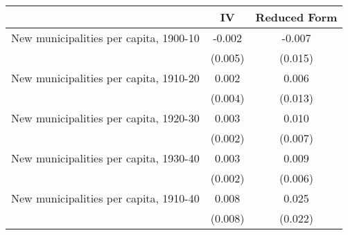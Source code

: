  \begin{tabular}{l*{2}{c}} \toprule
                &\multicolumn{1}{c}{IV}&\multicolumn{1}{c}{Reduced Form}\\
\midrule
New municipalities per capita, 1900-10&   -0.002   &   -0.007   \\
                &  (0.005)   &  (0.015)   \\
\addlinespace
New municipalities per capita, 1910-20&    0.002   &    0.006   \\
                &  (0.004)   &  (0.013)   \\
\addlinespace
New municipalities per capita, 1920-30&    0.003   &    0.010   \\
                &  (0.002)   &  (0.007)   \\
\addlinespace
New municipalities per capita, 1930-40&    0.003   &    0.009   \\
                &  (0.002)   &  (0.006)   \\
\addlinespace
New municipalities per capita, 1910-40&    0.008   &    0.025   \\
                &  (0.008)   &  (0.022)   \\
       \bottomrule \end{tabular}
